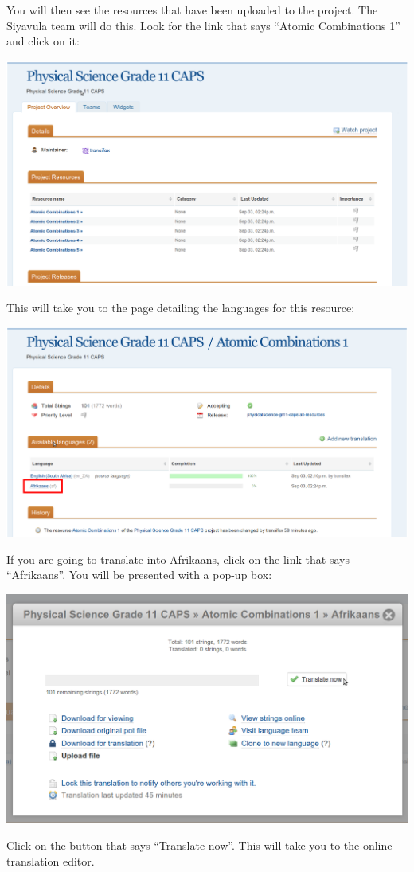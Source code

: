 \documentclass[10pt, a4paper]{article}
\begin{document}
You will then see the resources that have been uploaded to the project. The Siyavula team will do this. Look for the link that says ``Atomic Combinations 1'' and click on it:
\begin{center}
    \centerline{\includegraphics[width=0.8\paperwidth]{images/selectresource.png}}
\end{center}
This will take you to the page detailing the languages for this resource:
\begin{center}
    \centerline{\includegraphics[width=0.8\paperwidth]{images/availablelanguages.png}}
\end{center}

If you are going to translate into Afrikaans, click on the link that says ``Afrikaans''. You will be presented with a pop-up box:
\begin{center}
    \centerline{\includegraphics[width=0.8\paperwidth]{images/translatenow.png}}
\end{center}
Click on the button that says ``Translate now''. This will take you to the online translation editor.
\end{document}
